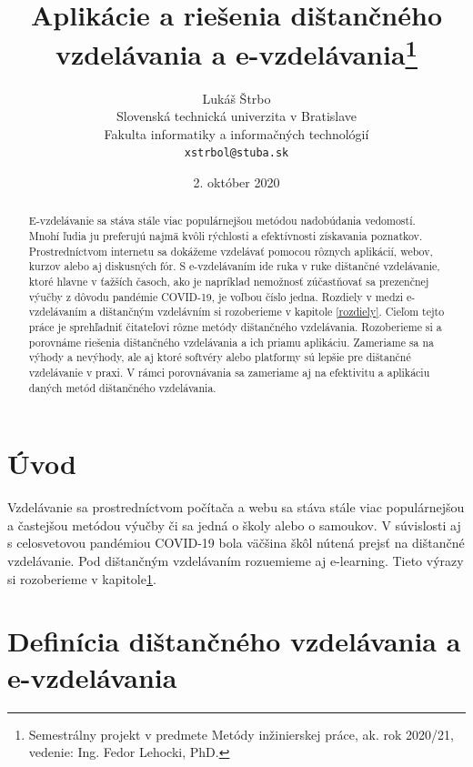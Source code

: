 \documentclass[10pt,oneside,slovak,a4paper]{article}
\title{Aplikácie a riešenia dištančného vzdelávania a e-vzdelávania\thanks{Semestrálny projekt v predmete Metódy inžinierskej práce, ak. rok 2020/21, vedenie: Ing. Fedor Lehocki, PhD.}}
\author{Lukáš Štrbo\\[2pt]
	{\small Slovenská technická univerzita v Bratislave}\\
	{\small Fakulta informatiky a informačných technológií}\\
	{\small \texttt{xstrbol@stuba.sk}}
	}
\date{\small 2. október 2020}
\begin{document}
\maketitle

\begin{abstract}
E-vzdelávanie sa stáva stále viac populárnejšou metódou nadobúdania vedomostí. Mnohí ľudia ju preferujú najmä kvôli rýchlosti a efektívnosti získavania poznatkov.
Prostredníctvom internetu sa dokážeme vzdelávať pomocou rôznych aplikácií, webov, kurzov alebo aj diskusných fór.
S e-vzdelávaním ide ruka v ruke dištančné vzdelávanie, ktoré hlavne v ťažších časoch, ako je napríklad nemožnosť zúčastňovať sa prezenčnej výučby z dôvodu pandémie COVID-19, 
 je voľbou číslo jedna. Rozdiely v medzi e-vzdelávaním a dištančným vzdelávním si rozoberieme v kapitole \ref{rozdiely}. Cieľom tejto práce je sprehľadniť čitateľovi rôzne metódy dištančného vzdelávania. Rozoberieme si a porovnáme riešenia dištančného vzdelávania a ich priamu
 aplikáciu. Zameriame sa na výhody a nevýhody, ale aj ktoré softvéry alebo platformy sú lepšie pre dištančné vzdelávanie v praxi. 
 V rámci porovnávania sa zameriame aj na efektivitu a aplikáciu daných metód dištančného vzdelávania.
\end{abstract}



\section*{Úvod} %
\label{uvod}
Vzdelávanie sa prostredníctvom počítača a webu sa stáva stále viac populárnejšou a častejšou metódou výučby či sa jedná o školy alebo o samoukov. V súvislosti aj s celosvetovou pandémiou 
 COVID-19 bola väčšina škôl nútená prejsť na dištančné vzdelávanie. Pod dištančným vzdelávaním rozuemieme aj e-learning. Tieto výrazy si rozoberieme v kapitole\ref{rozdiely}.  

\section{Definícia dištančného vzdelávania a e-vzdelávania}
\label{rozdiely}
\end{document}
